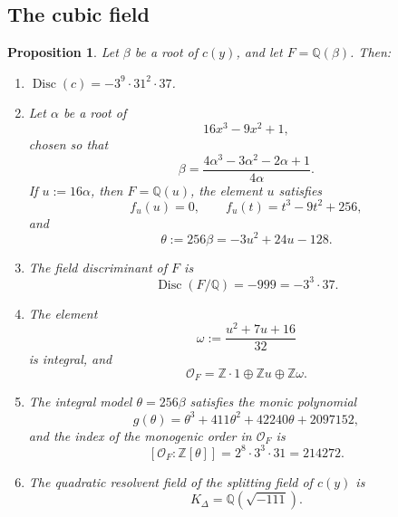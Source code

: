 \documentclass[11pt,letterpaper]{article}
\theoremstyle{plain}
\newtheorem{proposition}[theorem]{Proposition}
\theoremstyle{remark}
\newcommand{\QQ}{\mathbb{Q}}
\newcommand{\ZZ}{\mathbb{Z}}
\newcommand{\Disc}{\operatorname{Disc}}
\begin{document}
\subsection{The cubic field}

\begin{proposition}\label{prop:number-field}
Let \(\beta\) be a root of \(c(y)\), and let \(F=\QQ(\beta)\).
Then:
\begin{enumerate}
\item[(i)] \(\Disc(c)=-3^9\cdot 31^2\cdot 37\).
\item[(ii)] Let \(\alpha\) be a root of
\[
16x^3-9x^2+1,
\]
chosen so that
\[
\beta=\frac{4\alpha^3-3\alpha^2-2\alpha+1}{4\alpha}.
\]
If \(u:=16\alpha\), then \(F=\QQ(u)\), the element \(u\) satisfies
\[
f_u(u)=0,\qquad f_u(t)=t^3-9t^2+256,
\]
and
\[
\theta:=256\beta=-3u^2+24u-128.
\]
\item[(iii)] The field discriminant of \(F\) is
\[
\Disc(F/\QQ)=-999=-3^3\cdot 37.
\]
\item[(iv)] The element
\[
\omega:=\frac{u^2+7u+16}{32}
\]
is integral, and
\[
\mathcal O_F=\ZZ\cdot 1\oplus \ZZ u\oplus \ZZ\omega.
\]
\item[(v)] The integral model \(\theta=256\beta\) satisfies the monic polynomial
\[
g(\theta)=\theta^3+411\theta^2+42240\theta+2097152,
\]
and the index of the monogenic order in \(\mathcal O_F\) is
\[
[\mathcal O_F:\ZZ[\theta]]=2^8\cdot 3^3\cdot 31=214272.
\]
\item[(vi)] The quadratic resolvent field of the splitting field of \(c(y)\) is
\[
K_\Delta=\QQ(\sqrt{-111}).
\]
\end{enumerate}
\end{proposition}
\end{document}
